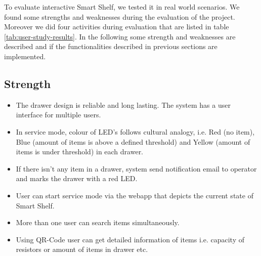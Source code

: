  
To evaluate interactive Smart Shelf, we tested it in real world scenarios.
We found some strengths and weaknesses during the evaluation of the project. 
Moreover we did four activities during evaluation that are listed in table \ref{tab:user-study-results}.
In the following some strength and weaknesses are described and if the functionalities described in previous sections are implemented. 

\subsection{Strength} 
\begin{itemize}
  \item The drawer design is reliable and long lasting. 
  The system has a user interface for multiple users.
   \item In service mode, colour of LED's follows cultural analogy, i.e. Red (no item), Blue (amount of items is above a defined threshold) and Yellow (amount of items is under threshold) in each drawer.
   \item If there isn't any item in a drawer, system send notification email to operator and marks the drawer with a red LED.
   \item User can start service mode via the webapp that depicts the current state of Smart Shelf.
   \item More than one user can search items simultaneously.
   \item Using QR-Code user can get detailed information of items i.e. capacity of resistors or amount of items in drawer etc.
\end{itemize}

